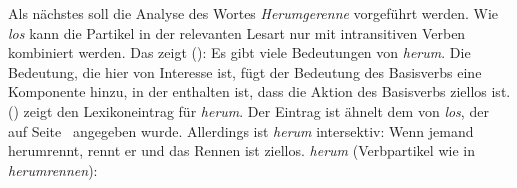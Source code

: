 Als nächstes soll die Analyse des Wortes \emph{Herumgerenne} vorgeführt werden.
Wie \emph{los} kann die Partikel  in der relevanten Lesart nur mit intransitiven Verben kombiniert werden.
Das zeigt ():
\eal
{}
\zl
Es gibt viele Bedeutungen von \emph{herum}. Die Bedeutung,
die hier von Interesse ist, fügt der Bedeutung des Basisverbs
eine Komponente hinzu, in der enthalten ist, dass die Aktion
des Basisverbs ziellos ist.
() zeigt den Lexikoneintrag für \emph{herum}.
Der Eintrag ist ähnelt dem von \emph{los}, der auf Seite~\pageref{le-los-asp}
angegeben wurde. Allerdings ist \emph{herum} intersektiv: Wenn jemand herumrennt, rennt er und das
Rennen ist ziellos. 
%
\eas
\label{le-herum-part}%
\emph{herum} (Verbpartikel wie in \emph{herumrennen}):\\
\zs

